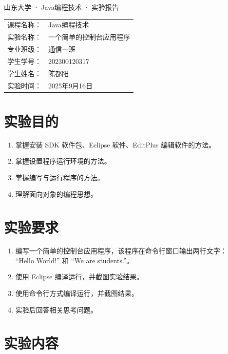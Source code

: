 \documentclass[12pt,a4paper]{article}
\begin{document}
\begin{center}
    \heiti{} 山东大学 · Java编程技术 · 实验报告 \\
    \vspace{1cm}
\end{center}

\begin{tabular}{rl}
    课程名称： & Java编程技术 \\
    实验名称： & 一个简单的控制台应用程序 \\
    专业班级： & 通信一班 \\
    学生学号： & 202300120317 \\
    学生姓名： & 陈都阳 \\
    实验时间： & 2025年9月16日 \\
\end{tabular}

\vspace{1cm}

\section*{实验目的}
\begin{enumerate}
    \item 掌握安装 SDK 软件包、Eclipse 软件、EditPlus 编辑软件的方法。
    \item 掌握设置程序运行环境的方法。
    \item 掌握编写与运行程序的方法。
    \item 理解面向对象的编程思想。
\end{enumerate}

\section*{实验要求}
\begin{enumerate}
    \item 编写一个简单的控制台应用程序，该程序在命令行窗口输出两行文字：\\
    “Hello World!” 和 “We are students.”。
    \item 使用 Eclipse 编译运行，并截图实验结果。
    \item 使用命令行方式编译运行，并截图结果。
    \item 实验后回答相关思考问题。
\end{enumerate}

\section*{实验内容}
\end{document}
